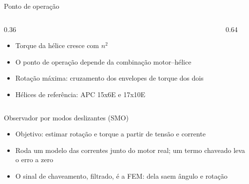 \begin{frame}{Ponto de operação}
  \begin{columns}[c]
    \begin{column}{0.36\textwidth}
      \begin{itemize}
        \item Torque da hélice cresce com $n^2$
        \item O ponto de operação depende da combinação motor--hélice
        \item Rotação máxima: cruzamento dos envelopes de torque dos dois
        \item Hélices de referência: APC 15x6E e 17x10E
      \end{itemize}
    \end{column}
    \begin{column}{0.64\textwidth}
      \centering
    \end{column}
  \end{columns}
\end{frame}

\begin{frame}{Observador por modos deslizantes (SMO)}
  \centering
  \begin{itemize}
    \small
    \item Objetivo: estimar rotação e torque a partir de tensão e corrente
    \item Roda um modelo das correntes junto do motor real; um termo
          chaveado leva o erro a zero
    \item O sinal de chaveamento, filtrado, é a FEM: dela saem ângulo e rotação
  \end{itemize}
\end{frame}
